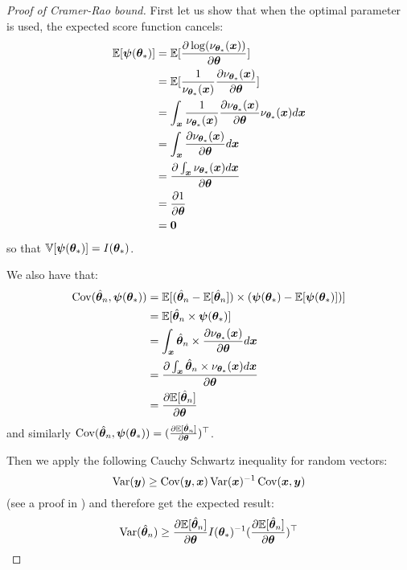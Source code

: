 \begin{proof}[Proof of Cramer-Rao bound]
  First let us show that when the optimal parameter is used, the expected score
  function cancels:
  \begin{align}
    \EE[\psib(\thetab_*)] 
    &= \EE[\partialfrac{\thetab}{\log(\nu_{\thetab_*}(\xb))}] \\
                         &= \EE[\frac1{\nu_{\thetab_*}(\xb)}\partialfrac{\thetab}{\nu_{\thetab_*}(\xb)}] \\
    &= \int_{\xb} \frac1{\nu_{\thetab_*}(\xb)}\partialfrac{\thetab}{\nu_{\thetab_*}(\xb)} \nu_{\thetab_*}(\xb) d\xb \\
    &= \int_{\xb} \partialfrac{\thetab}{\nu_{\thetab_*}(\xb)} d\xb \\
    &= \partialfrac{\thetab}{\int_{\xb} \nu_{\thetab_*}(\xb)d\xb}  \\
    &= \partialfrac{\thetab}{1} \\
    &= \bzero
  \end{align}
  so that $\VV[\psib(\thetab_*)] = I(\thetab_*)$.

  We also have that:
  \begin{align}
    \Cov(\hat{\thetab}_n, \psib(\thetab_*)) &= \EE[ (\hat{\thetab}_n - \EE[\hat{\thetab}_n]) \times (\psib(\thetab_*) -  \EE[\psib(\thetab_*)])]\\
                                           &= \EE[ \hat{\thetab}_n \times \psib(\thetab_*)]\\
                                           &= \int_{\xb} \hat{\thetab}_n \times \partialfrac{\thetab}{\nu_{\thetab_*}(\xb)} d\xb \\
                                           &= \partialfrac{\thetab}{\int_{\xb} \hat{\thetab}_n \times \nu_{\thetab_*}(\xb) d\xb} \\
                                           &= \partialfrac{\thetab}{\EE[\hat{\thetab}_n]}
  \end{align}
  and similarly $\Cov(\hat{\thetab}_n, \psib(\thetab_*)) = (\partialfrac{\thetab}{\EE[\hat{\thetab}_n]})^{\top}$.

  Then we apply the following Cauchy Schwartz inequality for random vectors:
  \begin{equation}
  \Var(\yb) \geq  \Cov(\yb, \xb) \Var(\xb)^{-1} \Cov(\xb, \yb)
  \end{equation}
(see a proof in \cite{tripathi1999matrix})
and therefore get the expected result:
  \begin{align}
    \Var(\hat{\thetab}_n) \geq  \partialfrac{\thetab}{\EE[\hat{\thetab}_n]} I(\thetab_*)^{-1} (\partialfrac{\thetab}{\EE[\hat{\thetab}_n]})^{\top} 
  \end{align}
\end{proof}

